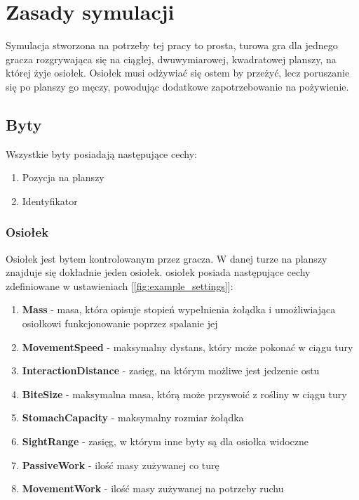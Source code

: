 \chapter{Zasady symulacji}
Symulacja stworzona na potrzeby tej pracy to prosta, turowa gra dla jednego gracza rozgrywająca się na ciągłej, dwuwymiarowej, kwadratowej planszy, na której żyje osiołek. Osiołek musi odżywiać się ostem by przeżyć, lecz poruszanie się po planszy go męczy, powodując dodatkowe zapotrzebowanie na pożywienie.

\section{Byty}
Wszystkie byty posiadają następujące cechy:
\begin{enumerate}    
    \item Pozycja na planszy
    \item Identyfikator
\end{enumerate}

\subsection{Osiołek}
Osiołek jest bytem kontrolowanym przez gracza. W danej turze na planszy znajduje się dokładnie jeden osiołek. osiołek posiada następujące cechy zdefiniowane w ustawieniach [\ref{fig:example_settings}]:
\begin{enumerate}    
    \item \textbf{Mass} - masa, która opisuje stopień wypełnienia żołądka i umożliwiająca osiołkowi funkcjonowanie poprzez spalanie jej
    \item \textbf{MovementSpeed} - maksymalny dystans, który może pokonać w ciągu tury
    \item \textbf{InteractionDistance} - zasięg, na którym możliwe jest jedzenie ostu
    \item \textbf{BiteSize} - maksymalna masa, którą może przyswoić z rośliny w ciągu tury
    \item \textbf{StomachCapacity} - maksymalny rozmiar żołądka
    \item \textbf{SightRange} - zasięg, w którym inne byty są dla osiołka widoczne
    \item \textbf{PassiveWork} - ilość masy zużywanej co turę
    \item \textbf{MovementWork} - ilość masy zużywanej na potrzeby ruchu 
\end{enumerate}

